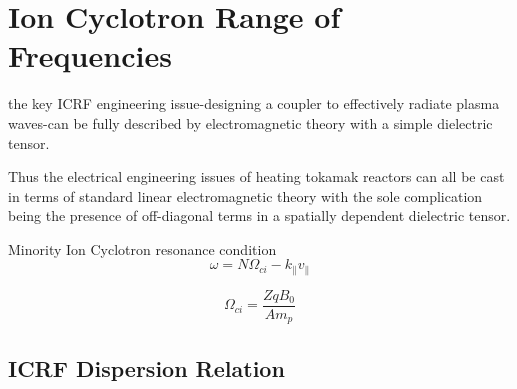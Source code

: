 % 
% 

\section{Ion Cyclotron Range of Frequencies}\label{sec:icrh}




the key ICRF engineering issue-designing a coupler to effectively radiate plasma waves-can be fully described by electromagnetic theory with a simple dielectric tensor\cite{perkins1984}.

Thus the electrical engineering issues of heating tokamak
reactors can all be cast in terms of standard linear electromagnetic
theory with the sole complication being the presence
of off-diagonal terms in a spatially dependent dielectric tensor\cite{perkins1984}.

Minority Ion Cyclotron resonance condition
\begin{equation}
	\omega = N\Omega_{ci} - k_\parallel v_\parallel
\label{eq:ion_cylotron_resonance_general}
\end{equation}

\begin{equation}
\Omega_{ci} = \frac{Z q B_0}{A m_p}
\label{eq:ion_cyclotron_angular_frequency}
\end{equation}

\subsection{ICRF Dispersion Relation}

